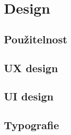 \chapter{Design}

\blindtext

\section{Použitelnost}
\blindtext[1]

\section{UX design}
\blindtext[1]

\section{UI design}
\blindtext[1]

\section{Typografie}
\blindtext[1]

